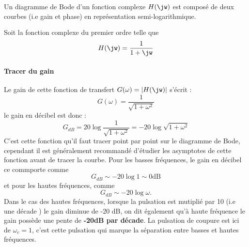 Un diagramme de Bode d'un fonction complexe $H(\jw)$ est composé de deux courbes (i.e gain et phase) 
en représentation semi-logarithmique.

Soit la fonction complexe du premier ordre telle que 
\begin{align}
H(\jw)=\dfrac{1}{1+\jw}\label{eq-ft_annexe}
\end{align}

\paragraph{Tracer du gain}
Le gain de cette fonction de transfert $G(\omega)=|H(\jw)|$ s'écrit :
$$
G(\omega) =\dfrac{1}{\sqrt{1+\omega^2}}
$$
le gain en décibel est donc :
$$
G_{dB}=20\log{\dfrac{1}{\sqrt{1+\omega^2}}}=-20\log{\sqrt{1+\omega^2}}
$$
C'est cette fonction qu'il faut tracer point par point sur le diagramme de Bode, cependant il est généralement 
recommandé d'étudier les asymptotes de cette fonction avant de tracer la courbe. 
Pour les basses fréquences, le gain en décibel ce commporte comme 
$$
G_{dB}\sim-20\log{1}\sim 0\text{dB}
$$ 
et pour les hautes fréquences, comme
$$
G_{dB}\sim -20\log{\omega}.
$$
Dans le cas des hautes fréquences, lorsque la pulsation est mutiplié 
par 10 (i.e une décade ) le gain diminue de -20 dB, 
on dit également qu'à haute fréquence le gain possède une pente de \textbf{-20dB par décade}. 
La pulsation de coupure est ici de $\omega_{c}=1$, c'est cette pulsation qui marque la \og séparation\fg 
entre basses et hautes fréquences. 

